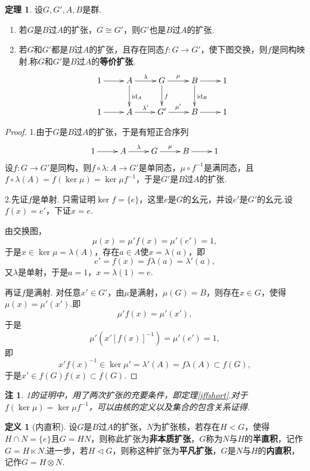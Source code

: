 \documentclass[12pt]{ctexart}
\theoremstyle{definition}
\newtheorem{definition}{定义}[section]
\newtheorem{theorem}{定理}[section]
\theoremstyle{plain}
\newtheorem*{remark}{注}
\newcommand{\id}{\mathrm{id}}
\begin{document}
\begin{theorem}
	设$G,G',A,B$是群.
	\begin{enumerate}
		\item 若$G$是$B$过$A$的扩张，$G\cong G'$，则$G'$也是$B$过$A$的扩张.
		\item 若$G$和$G'$都是$B$过$A$的扩张，且存在同态$f:G\to G'$，使下图交换，则$f$是同构映射.称$G$和$G'$是$B$过$A$的\textbf{等价扩张}.
		\begin{displaymath}
			\xymatrix{
				1\ar[r] & A\ar[r]^{\lambda}\ar[d]^{\id_A} & G\ar[r]^{\mu}\ar[d]^{f} & B\ar[r]\ar[d]^{\id_B} & 1\\
				1\ar[r] & A\ar[r]^{\lambda'} & G'\ar[r]^{\mu'} & B\ar[r] & 1
			}
		\end{displaymath}
	\end{enumerate}
\end{theorem}
\begin{proof}
	1.由于$G$是$B$过$A$的扩张，于是有短正合序列
	\begin{displaymath}
		\xymatrix{
			1\ar[r] & A\ar[r]^{\lambda} & G\ar[r]^{\mu} & B\ar[r] & 1
		}
	\end{displaymath}
	设$f:G\to G'$是同构，则$f\circ\lambda:A\to G'$是单同态，$\mu\circ f^{-1}$是满同态，且$f\circ\lambda(A)=f(\ker\mu)=\ker\mu f^{-1}$，于是$G'$是$B$过$A$的扩张.
	
	2.先证$f$是单射. 只需证明$\ker f=\{e\}$，这里$e$是$G$的幺元，并设$e'$是$G'$的幺元.设$f(x)=e'$，下证$x=e$.
	
	由交换图，
	$$\mu(x)=\mu'f(x)=\mu'(e')=1,$$
	于是$x\in\ker\mu=\lambda(A)$，存在$a\in A$使$x=\lambda(a)$，即
	$$e'=f(x)=f\lambda(a)=\lambda'(a),$$
	又$\lambda$是单射，于是$a=1$，$x=\lambda(1)=e$.
	
	再证$f$是满射. 对任意$x'\in G'$，由$\mu$是满射，$\mu(G)=B$，则存在$x\in G$，使得$\mu(x)=\mu'(x')$.即
	$$\mu'f(x)=\mu'(x'),$$
	于是
	$$\mu'\left(x'\left[f(x)\right]^{-1}\right)=\mu'(e')=1,$$
	即
	$$x'f(x)^{-1}\in\ker\mu'=\lambda'(A)=f\lambda(A)\subset f(G),$$
	于是$x'\in f(G)f(x)\subset f(G)$.
\end{proof}
\begin{remark}
	1的证明中，用了两次扩张的充要条件，即定理\ref{iffshort}.对于$f(\ker\mu)=\ker\mu f^{-1}$，可以由核的定义以及集合的包含关系证得.
\end{remark}
\begin{definition}[内直积]
	设$G$是$B$过$A$的扩张，$N$为扩张核，若存在$H<G$，使得$H\cap N=\{e\}$且$G=HN$，则称此扩张为\textbf{非本质扩张}，$G$称为$N$与$H$的\textbf{半直积}，记作$G=H\ltimes N$.进一步，若$H\lhd G$，则称这种扩张为\textbf{平凡扩张}，$G$是$N$与$H$的\textbf{内直积}，记作$G=H\otimes N$.
\end{definition}
\end{document}
